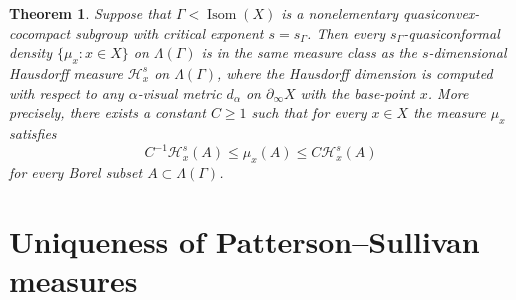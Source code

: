 \documentclass[12pt]{amsbook}%
\newtheorem{thm}{Theorem}[chapter]
\newtheorem{cor}[thm]{Corollary}
\theoremstyle{definition}
\theoremstyle{remark}
\numberwithin{section}{chapter}
\numberwithin{subsection}{section}
\numberwithin{figure}{chapter}
\DeclareMathOperator{\Isom}{Isom}
\DeclareMathOperator{\acts}{\curvearrowright}
\def\Ga{\Gamma}
\def\La{\Lambda}
\def\al{\alpha}
\def\geo{\partial_\infty}
\def\mini{\scriptsize}
\begin{document}
{{\begin{thm}\label{thm:Hausdorff-qc}
Suppose that $\Ga< \Isom(X)$ is a nonelementary quasicon\-vex-cocompact subgroup with critical exponent $s=s_\Ga$. Then every $s_\Ga$-quasiconformal density $\{\mu_x: x\in X\}$%
on $\La(\Ga)$ is in the same measure class as the $s$-dimensional Hausdorff measure ${\mathcal H}_x^{s}$ on $\La(\Ga)$, where the Hausdorff dimension is computed with respect to any $\al$-visual metric $d_\al$ on $\geo X$ with the base-point $x$. More precisely, 
there exists a constant $C\geqslant 1$ such that 
for every $x\in X$  the measure $\mu_x$ satisfies  
$$
C^{-1}{\mathcal H}_x^{s}(A)\leqslant \mu_x(A)\leqslant C{\mathcal H}_x^{s}(A)
$$
for every Borel subset $A\subset \La(\Ga)$.  
\end{thm}








\section{Uniqueness of Patterson--Sullivan measures} \label{sec:uniqueness}

}}
\end{document}
